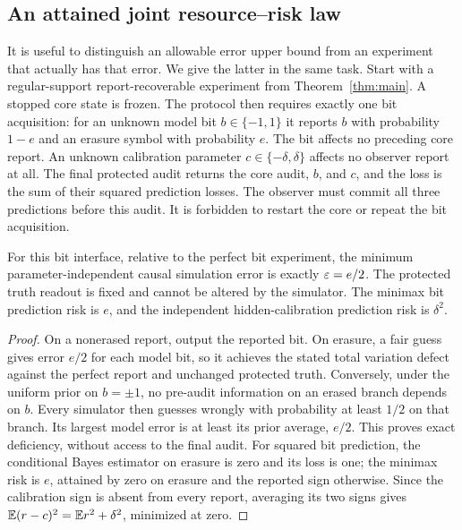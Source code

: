 \subsection{An attained joint resource--risk law}
It is useful to distinguish an allowable error upper bound from an experiment that actually has that error. We give the latter in the same task. Start with a regular-support report-recoverable experiment from Theorem~\ref{thm:main}. A stopped core state is frozen. The protocol then requires exactly one bit acquisition: for an unknown model bit $b\in\{-1,1\}$ it reports $b$ with probability $1-e$ and an erasure symbol with probability $e$. The bit affects no preceding core report. An unknown calibration parameter $c\in\{-\delta,\delta\}$ affects no observer report at all. The final protected audit returns the core audit, $b$, and $c$, and the loss is the sum of their squared prediction losses. The observer must commit all three predictions before this audit. It is forbidden to restart the core or repeat the bit acquisition.

\begin{lemma}\label{lem:erasure}
For this bit interface, relative to the perfect bit experiment, the minimum parameter-independent causal simulation error is exactly $\varepsilon=e/2$. The protected truth readout is fixed and cannot be altered by the simulator. The minimax bit prediction risk is $e$, and the independent hidden-calibration prediction risk is $\delta^2$.
\end{lemma}
\begin{proof}
On a nonerased report, output the reported bit. On erasure, a fair guess gives error $e/2$ for each model bit, so it achieves the stated total variation defect against the perfect report and unchanged protected truth. Conversely, under the uniform prior on $b=\pm1$, no pre-audit information on an erased branch depends on $b$. Every simulator then guesses wrongly with probability at least $1/2$ on that branch. Its largest model error is at least its prior average, $e/2$. This proves exact deficiency, without access to the final audit. For squared bit prediction, the conditional Bayes estimator on erasure is zero and its loss is one; the minimax risk is $e$, attained by zero on erasure and the reported sign otherwise. Since the calibration sign is absent from every report, averaging its two signs gives $\mathbb E(r-c)^2=\mathbb E r^2+\delta^2$, minimized at zero.
\end{proof}

